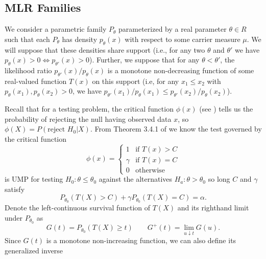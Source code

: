 \documentclass{article}
\begin{document}
\begin{appendix}
\subsection{MLR Families}

We consider a parametric family $P_{\theta}$ parameterized by a real parameter $\theta \in R$ such that each $P_{\theta}$ has density $p_{\theta}(x)$ with respect to some carrier measure $\mu$. We will suppose that these densities share support (i.e., for any two $\theta$ and $\theta'$ we have $p_{\theta}(x) > 0 \iff p_{\theta'}(x)> 0$). Further, we suppose that for any $\theta < \theta'$, the likelihood ratio $p_{\theta'}(x)/p_{\theta}(x)$ is a monotone non-decreasing function of some real-valued function $T(x)$ on this support (i.e, for any $x_1 \leq x_2$ with $p_{\theta}(x_1), p_{\theta}(x_2) > 0$, we have $p_{\theta'}(x_1)/p_{\theta}(x_1) \leq p_{\theta'}(x_2)/p_{\theta}(x_2)$). 


Recall that for a testing problem, the critical function $\phi(x)$ (see \cite[Section 3.1]{Lehmann}) tells us the probability of rejecting the null having observed data $x$, so $\phi(X) = P(\text{reject } H_0 | X)$. From Theorem 3.4.1 of \cite{Lehmann} we know the test governed by the critical function 
\begin{equation}
    \label{eq:mlr_test}
    \phi(x) = \begin{cases}
        1 &\text{if } T(x) > C  \\
        \gamma &\text{if } T(x) = C  \\
        0 & \text{otherwise }
    \end{cases}
\end{equation}
is UMP for testing $H_0 : \theta \leq \theta_0$ against the alternatives $H_a : \theta > \theta_0 $ so long $C$ and $\gamma$ satisfy
\begin{equation}
    \label{eq:constraint}
    P_{\theta_0}(T(X) > C) + \gamma P_{\theta_0}(T(X) = C) = \alpha.
\end{equation}
Denote the left-continuous survival function of $T(X)$ and its righthand limit under $P_{\theta_0}$ as
\begin{equation*}
    G(t) = P_{\theta_0}(T(X) \geq t) \qquad G^+(t) = \lim_{u \downarrow t} G(u).
\end{equation*}
Since $G(t)$ is a monotone non-increasing function, we can also define its generalized inverse 


\end{appendix}
\end{document}
